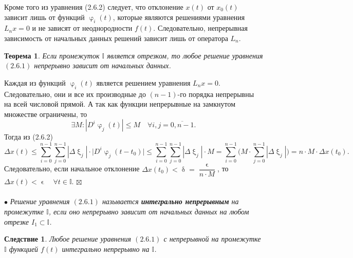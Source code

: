 \documentclass[a4paper, 12pt]{report}
\newenvironment{Proof} %
{\par\noindent{$\blacklozenge$}} %
{\hfill$\scriptstyle\boxtimes$}
\newcommand{\I}{\mathbb{I}}
\renewcommand{\delta}{\updelta}
\renewcommand{\varphi}{\upvarphi}
\renewcommand{\xi}{\upxi}
\newtheorem*{theorem}{Теорема}
\newtheorem*{cor}{Следствие}
\begin{document}
Кроме того из уравнения (2.6.2) следует, что отклонение $x(t)$ от $x_0(t)$ зависит лишь от функций $\varphi_i(t)$, которые являются решениями уравнения $L_nx = 0$ и не зависят от неоднородности $f(t)$. Следовательно, непрерывная зависимость от начальных данных решений зависит лишь от оператора $L_n$.
\begin{theorem}
	Если промежуток $\I$ является отрезком, то любое решение уравнения $(2.6.1)$ непрерывно зависит от начальных данных.
\end{theorem}\begin{Proof}
Каждая из функций $\varphi_i(t)$ является решением уравнения $L_nx = 0$. Следовательно, они и все их производные до $(n-1)$-го порядка непрерывны на всей числовой прямой. А так как функции непрерывные на замкнутом множестве ограничены, то $$\exists M : |D^i\varphi_j(t)|\leqslant M\quad \forall i,j = \overline{0, n-1}.$$
Тогда из (2.6.2) $$\Delta x(t) \leqslant\sum_{i = 0}^{n-1}\sum_{j = 0}^{n-1} | \Delta \xi_j|\cdot \Big|D^i\varphi_j(t-t_0)\Big|\leqslant \sum_{i = 0}^{n-1}\sum_{j = 0}^{n-1} | \Delta \xi_j|\cdot M = \sum_{i = 0}^{n-1}\Big(M\cdot \sum_{j = 0}^{n-1} | \Delta \xi_j|\Big) = n\cdot M\cdot \Delta x(t_0).$$
Следовательно, если начальное отклонение $\Delta x(t_0) < \delta = \dfrac{\upvarepsilon}{n\cdot M}$, то $\Delta x(t) < \upvarepsilon\quad \forall t \in \I$.
\end{Proof}\\\\
$\bullet$ \textit{Решение уравнения $(2.6.1)$ называется \textbf{интегрально непрерывным} на промежутке $\I$, если оно непрерывно зависит от начальных данных на любом отрезке $I_1 \subset \I$.}
\begin{cor}
	Любое решение уравнения $(2.6.1)$ с непрерывной на промежутке $\I$ функцией $f(t)$ интегрально непрерывно на $\I$.
\end{cor}
\end{document}

